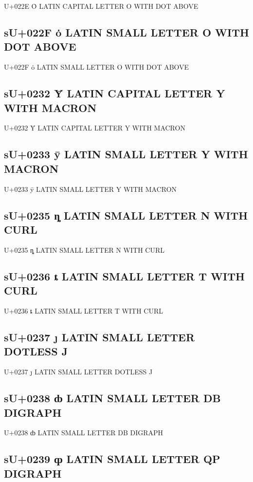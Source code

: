 U+022E Ȯ LATIN CAPITAL LETTER O WITH DOT ABOVE

\subsection{sU+022F ȯ LATIN SMALL LETTER O WITH DOT ABOVE}

U+022F ȯ LATIN SMALL LETTER O WITH DOT ABOVE

\subsection{sU+0232 Ȳ LATIN CAPITAL LETTER Y WITH MACRON}

U+0232 Ȳ LATIN CAPITAL LETTER Y WITH MACRON

\subsection{sU+0233 ȳ LATIN SMALL LETTER Y WITH MACRON}

U+0233 ȳ LATIN SMALL LETTER Y WITH MACRON

\subsection{sU+0235 ȵ LATIN SMALL LETTER N WITH CURL}

U+0235 ȵ LATIN SMALL LETTER N WITH CURL

\subsection{sU+0236 ȶ LATIN SMALL LETTER T WITH CURL}

U+0236 ȶ LATIN SMALL LETTER T WITH CURL

\subsection{sU+0237 ȷ LATIN SMALL LETTER DOTLESS J}

U+0237 ȷ LATIN SMALL LETTER DOTLESS J

\subsection{sU+0238 ȸ LATIN SMALL LETTER DB DIGRAPH}

U+0238 ȸ LATIN SMALL LETTER DB DIGRAPH

\subsection{sU+0239 ȹ LATIN SMALL LETTER QP DIGRAPH}

